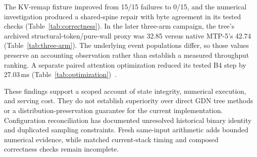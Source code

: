 \documentclass[conference]{IEEEtran}
\begin{document}
The KV-remap fixture improved from 15/15 failures to 0/15, and the numerical investigation produced a shared-spine repair with byte agreement in its tested checks (Table~\ref{tab:correctness}). In the later three-arm campaign, the tree's archived structural-token/pure-wall proxy was 32.85 versus native MTP-5's 42.74 (Table~\ref{tab:three-arm}). The underlying event populations differ, so those values preserve an accounting observation rather than establish a measured throughput ranking. A separate paired attention optimization reduced its tested B4 step by 27.03\,ms (Table~\ref{tab:optimization})~\cite{lumo2026archive}.

These findings support a scoped account of state integrity, numerical execution, and serving cost. They do not establish superiority over direct GDN tree methods or a distribution-preservation guarantee for the current implementation. Configuration reconciliation has documented unresolved historical binary identity and duplicated sampling constraints. Fresh same-input arithmetic adds bounded numerical evidence, while matched current-stack timing and composed correctness checks remain incomplete.

\label{ReferencesStart}


\end{document}
